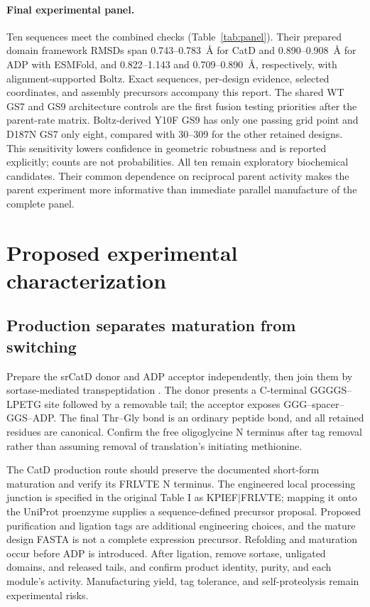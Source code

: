 \documentclass{article}
\newcommand{\angstrom}{\textup{\AA}}
\begin{document}
\paragraph{Final experimental panel.}
Ten sequences meet the combined checks (Table~\ref{tab:panel}). Their prepared
domain framework RMSDs span 0.743--0.783~\angstrom{} for CatD and
0.890--0.908~\angstrom{} for ADP with ESMFold, and 0.822--1.143 and
0.709--0.890~\angstrom{}, respectively, with alignment-supported Boltz.
Exact sequences, per-design evidence, selected coordinates, and assembly
precursors accompany this report. The shared WT GS7 and GS9 architecture
controls are the first fusion testing priorities after the parent-rate matrix.
Boltz-derived Y10F GS9 has only one passing grid point and D187N GS7 only eight,
compared with 30--309 for the other retained designs. This sensitivity lowers
confidence in geometric robustness and is reported explicitly; counts are
not probabilities. All ten remain exploratory biochemical candidates. Their
common dependence on reciprocal parent activity makes the parent experiment
more informative than immediate parallel manufacture of the complete panel.


\section{Proposed experimental characterization}
\subsection{Production separates maturation from switching}
Prepare the srCatD donor and ADP acceptor independently, then join them by
sortase-mediated transpeptidation \citep{popp2009,kobashigawa2009}.
The donor presents a C-terminal GGGGS--LPETG site followed by a removable tail;
the acceptor exposes GGG--spacer--GGS--ADP. The final Thr--Gly bond is an ordinary
peptide bond, and all retained residues are canonical. Confirm the free
oligoglycine N terminus after tag removal rather than assuming removal of
translation's initiating methionine.

The CatD production route should preserve the documented short-form maturation
and verify its FRLVTE N terminus. The engineered local processing junction is
specified in the original Table I as KPIEF$|$FRLVTE; mapping it onto the UniProt
proenzyme supplies a sequence-defined precursor proposal. Proposed purification
and ligation tags are additional engineering choices, and the mature design
FASTA is not a complete expression precursor.
Refolding and maturation occur before ADP is introduced. After ligation, remove
sortase, unligated domains, and released tails, and confirm product identity,
purity, and each module's activity. Manufacturing yield, tag tolerance, and
self-proteolysis remain experimental risks.
\end{document}
